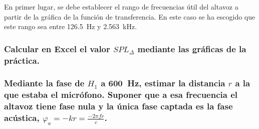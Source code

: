 \documentclass[10pt]{article}
\begin{document}
En primer lugar, se debe establecer el rango de frecuencias útil del altavoz a partir de la gráfica de la función de transferencia. En este caso se ha escogido que este rango sea entre \SI{126.5}{\Hz} y \SI{2.563}{\kilo\Hz}.

\subsubsection{Calcular en Excel el valor $SPL_{\Delta}$ mediante las gráficas de la práctica.}

\subsubsection{Mediante la fase de $H_1$ a \SI{600}{\Hz}, estimar la distancia $r$ a la que estaba el micrófono. Suponer que a esa frecuencia el altavoz tiene fase nula y la única fase captada es la fase acústica, $\varphi _a = -kr = \frac{-2\pi fr}{c}$.}
\end{document}
